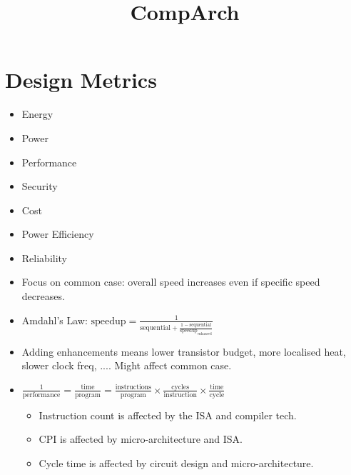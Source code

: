 \documentclass[a4paper, 11pt]{article}
\title{\vspace{-2.5cm}CompArch\vspace{-2cm}}
\author{}
\date{}
\begin{document}
\maketitle

\section*{Design Metrics}
{ 
    \begin{minipage}[t]{0.25\textwidth}
    \begin{itemize}
    \item Energy
    \item Power
    \item Performance
    \item Security
    \item Cost
    \item Power Efficiency
    \item Reliability
    \end{itemize}
    \end{minipage}
    \begin{minipage}[t]{0.7\textwidth}
    \setlength{\parskip}{8pt}
    \begin{itemize}
    \item Focus on common case: overall speed increases even if specific speed decreases.
    \item Amdahl's Law: \(\text{speedup} = \frac{1}{\text{sequential} + \frac{1 - \text{sequential}}{\text{speedup}_\text{enhanced}}}\)
    \item Adding enhancements means lower transistor budget, more localised heat, slower clock freq, .... Might affect common case.
    \item
    {
        \(\displaystyle \frac{1}{\text{performance}} = \frac{\text{time}}{\text{program}} = \frac{\text{instructions}}{\text{program}} \times \frac{\text{cycles}}{\text{instruction}} \times \frac{\text{time}}{\text{cycle}}\)

        \begin{itemize}
        \item Instruction count is affected by the ISA and compiler tech.
        \item CPI is affected by micro-architecture and ISA.
        \item Cycle time is affected by circuit design and micro-architecture.
        \end{itemize}
    }
    \end{itemize}
    \end{minipage}
}
\end{document}
